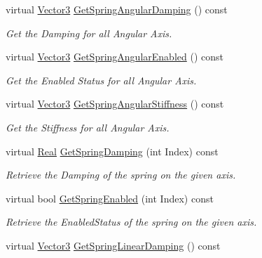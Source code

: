 \begin{DoxyCompactItemize}
\item 
virtual \hyperlink{classMezzanine_1_1Vector3}{Vector3} \hyperlink{classMezzanine_1_1Generic6DofSpringConstraint_ada9393664bbecfc885680ae677de81a3}{GetSpringAngularDamping} () const 
\begin{DoxyCompactList}\small\item\em Get the Damping for all Angular Axis. \item\end{DoxyCompactList}\item 
virtual \hyperlink{classMezzanine_1_1Vector3}{Vector3} \hyperlink{classMezzanine_1_1Generic6DofSpringConstraint_a5fab32fcbad143365220f973d7bdd0cb}{GetSpringAngularEnabled} () const 
\begin{DoxyCompactList}\small\item\em Get the Enabled Status for all Angular Axis. \item\end{DoxyCompactList}\item 
virtual \hyperlink{classMezzanine_1_1Vector3}{Vector3} \hyperlink{classMezzanine_1_1Generic6DofSpringConstraint_ac01ebe7832f9e444554809f120f1662b}{GetSpringAngularStiffness} () const 
\begin{DoxyCompactList}\small\item\em Get the Stiffness for all Angular Axis. \item\end{DoxyCompactList}\item 
virtual \hyperlink{namespaceMezzanine_a726731b1a7df72bf3583e4a97282c6f6}{Real} \hyperlink{classMezzanine_1_1Generic6DofSpringConstraint_ae48fbe9f4e98f869a4a21f83735a3540}{GetSpringDamping} (int Index) const 
\begin{DoxyCompactList}\small\item\em Retrieve the Damping of the spring on the given axis. \item\end{DoxyCompactList}\item 
virtual bool \hyperlink{classMezzanine_1_1Generic6DofSpringConstraint_aad97ef152f3917c5156e86576a163e7a}{GetSpringEnabled} (int Index) const 
\begin{DoxyCompactList}\small\item\em Retrieve the EnabledStatus of the spring on the given axis. \item\end{DoxyCompactList}\item 
virtual \hyperlink{classMezzanine_1_1Vector3}{Vector3} \hyperlink{classMezzanine_1_1Generic6DofSpringConstraint_aebffea969499acf9887b1be3c1f43204}{GetSpringLinearDamping} () const 

\end{DoxyCompactItemize}
